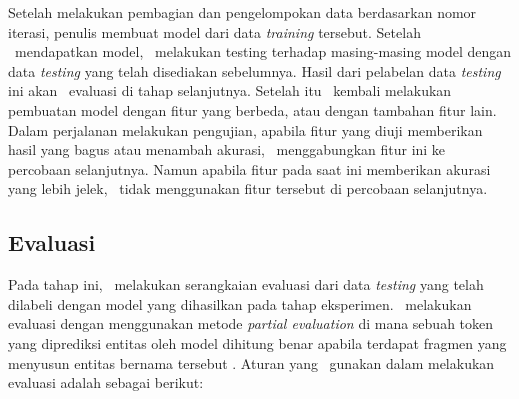 Setelah melakukan pembagian dan pengelompokan data berdasarkan nomor iterasi, penulis membuat model dari data \textit{training} tersebut. Setelah \saya~mendapatkan model, \saya~melakukan testing terhadap masing-masing model dengan data \textit{testing} yang telah disediakan sebelumnya. Hasil dari pelabelan data \textit{testing} ini akan \saya~evaluasi di tahap selanjutnya. Setelah itu \saya~kembali melakukan pembuatan model dengan fitur yang berbeda, atau dengan tambahan fitur lain. Dalam perjalanan melakukan pengujian, apabila fitur yang diuji memberikan hasil yang bagus atau menambah akurasi, \saya~menggabungkan fitur ini ke percobaan selanjutnya. Namun apabila fitur pada saat ini memberikan akurasi yang lebih jelek, \saya~tidak menggunakan fitur tersebut di percobaan selanjutnya.

\subsection{Evaluasi}
Pada tahap ini, \saya~melakukan serangkaian evaluasi dari data \textit{testing} yang telah dilabeli dengan model yang dihasilkan pada tahap eksperimen. \Saya~melakukan evaluasi dengan menggunakan metode \textit{partial evaluation} di mana sebuah token yang diprediksi entitas oleh model dihitung benar apabila terdapat fragmen yang menyusun entitas bernama tersebut \citep{seki2003probabilistic}. Aturan yang \saya~gunakan dalam melakukan evaluasi adalah sebagai berikut: 

